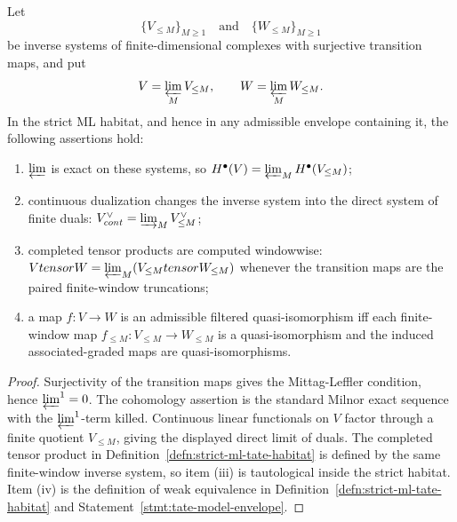 \begin{lem}
\label{lem:tate-mittag-leffler-dictionary}
  Let
  \[
    \{V_{\leq M}\}_{M\geq1}
    \quad\text{and}\quad
    \{W_{\leq M}\}_{M\geq1}
  \]
  be inverse systems of finite-dimensional complexes with surjective
  transition maps, and put
  \[
    V=\varprojlim_MV_{\leq M},\qquad
    W=\varprojlim_MW_{\leq M}.
  \]
  In the strict ML habitat, and hence in any admissible envelope
  containing it, the following assertions hold:
  \begin{enumerate}[label=(\roman*)]
    \item \(\varprojlim\) is exact on these systems, so
      \(H^\bullet(V)=\varprojlim_MH^\bullet(V_{\leq M})\);
    \item continuous dualization changes the inverse system into the
      direct system of finite duals:
      \(V^\vee_{\mathrm{cont}}=\varinjlim_MV_{\leq M}^\vee\);
    \item completed tensor products are computed windowwise:
      \(V\widehat\otimes W
        =\varprojlim_M(V_{\leq M}\otimes W_{\leq M})\) whenever the
      transition maps are the paired finite-window truncations;
    \item a map \(f\colon V\to W\) is an admissible filtered
      quasi-isomorphism iff each finite-window map
      \(f_{\leq M}\colon V_{\leq M}\to W_{\leq M}\) is a
      quasi-isomorphism and the induced associated-graded maps are
      quasi-isomorphisms.
  \end{enumerate}
\end{lem}

\begin{proof}
  Surjectivity of the transition maps gives the Mittag-Leffler
  condition, hence \(\varprojlim^1=0\).  The cohomology assertion is
  the standard Milnor exact sequence with the \(\varprojlim^1\)-term
  killed.  Continuous linear functionals on \(V\) factor through a
  finite quotient \(V_{\leq M}\), giving the displayed direct limit of
  duals.  The completed tensor product in
  Definition~\ref{defn:strict-ml-tate-habitat} is defined by the same
  finite-window inverse system, so item (iii) is tautological inside the
  strict habitat.  Item (iv) is the definition of weak equivalence in
  Definition~\ref{defn:strict-ml-tate-habitat} and
  Statement~\ref{stmt:tate-model-envelope}.
\end{proof}

